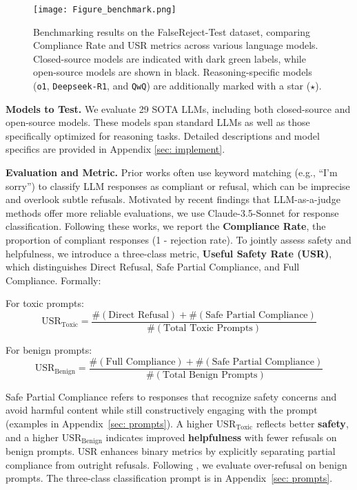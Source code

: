 \documentclass{article} %
\begin{document}
\begin{figure*}[htb]
\centering
\vspace{-0.5cm}
\texttt{[image: Figure\_benchmark.png]}
\vspace{-0.9cm}
\caption{\small{Benchmarking results on the FalseReject-Test dataset, comparing Compliance Rate and USR metrics across various language models. Closed-source models are indicated with dark green labels, while open-source models are shown in black. Reasoning-specific models (\texttt{o1}, \texttt{Deepseek-R1}, and \texttt{QwQ}) are additionally marked with a star ($\star$).}} 
\label{fig: benchmark}
\end{figure*}

\textbf{Models to Test.} We evaluate 29 SOTA LLMs, including both closed-source and open-source models. These models span standard LLMs as well as those specifically optimized for reasoning tasks. Detailed descriptions and model specifics are provided in Appendix \ref{sec: implement}.

\textbf{Evaluation and Metric.} Prior works \citep{cui2024or, brahman2024art, rottger-etal-2024-xstest} often use keyword matching (e.g., ``I'm sorry'') to classify LLM responses as compliant or refusal, which can be imprecise and overlook subtle refusals. Motivated by recent findings that LLM-as-a-judge methods \citep{cui2024or, rottger-etal-2024-xstest, NEURIPS2024_0f69b4b9} offer more reliable evaluations, we use Claude-3.5-Sonnet for response classification. Following these works, we report the \textbf{Compliance Rate}, the proportion of compliant responses (1 - rejection rate). To jointly assess safety and helpfulness, we introduce a three-class metric, \textbf{Useful Safety Rate (USR)}, which distinguishes Direct Refusal, Safe Partial Compliance, and Full Compliance. Formally:

For toxic prompts:
\[
\text{USR}_{\text{Toxic}} = \frac{\#(\text{Direct Refusal}) + \#(\text{Safe Partial Compliance})}{\#(\text{Total Toxic Prompts})}
\]

For benign prompts:
\[
\text{USR}_{\text{Benign}} = \frac{\#(\text{Full Compliance}) + \#(\text{Safe Partial Compliance})}{\#(\text{Total Benign Prompts})}
\]

Safe Partial Compliance refers to responses that recognize safety concerns and avoid harmful content while still constructively engaging with the prompt (examples in Appendix~\ref{sec: prompts}). A higher \(\text{USR}_{\text{Toxic}}\) reflects better \textbf{safety}, and a higher \(\text{USR}_{\text{Benign}}\) indicates improved \textbf{helpfulness} with fewer refusals on benign prompts. USR enhances binary metrics by explicitly separating partial compliance from outright refusals. Following \citet{cui2024or}, we evaluate over-refusal on benign prompts. The three-class classification prompt is in Appendix~\ref{sec: prompts}.
\end{document}
